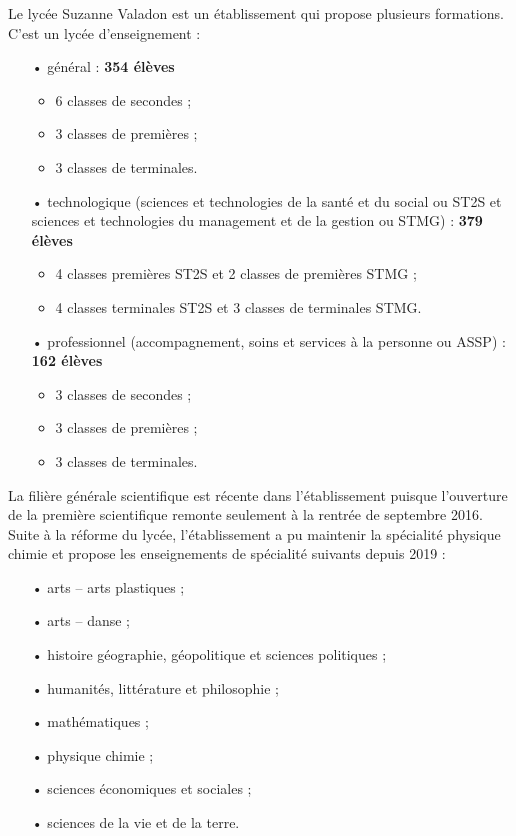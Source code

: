 \documentclass[12pt,a4paper]{article}
\begin{document}
Le lycée Suzanne Valadon est un établissement qui propose plusieurs formations.
C'est un lycée d'enseignement :
\begin{itemize}
\item[•] général : \hfill \textbf{354 élèves}
\begin{itemize}
\item 6 classes de secondes ;
\item 3 classes de premières ;
\item 3 classes de terminales.
\end{itemize}
\item[•] technologique (sciences et technologies de la santé et du social ou ST2S et sciences et technologies du management et de la gestion ou STMG) : \hfill \textbf{379 élèves}
\begin{itemize}
\item 4 classes premières ST2S et 2 classes de premières STMG ;
\item 4 classes terminales ST2S et 3 classes de terminales STMG.
\end{itemize}
\item[•] professionnel (accompagnement, soins et services à la personne ou ASSP) : \hfill \textbf{162 élèves}
\begin{itemize}
\item 3 classes de secondes ;
\item 3 classes de premières ;
\item 3 classes de terminales.
\end{itemize}
\end{itemize}

La filière générale scientifique est récente dans l'établissement puisque l'ouverture de la première scientifique remonte seulement à la rentrée de septembre 2016.
Suite à la réforme du lycée, l'établissement a pu maintenir la spécialité physique chimie et propose les enseignements de spécialité suivants depuis 2019 : 
\begin{itemize}
\item[•] arts -- arts plastiques ;
\item[•] arts -- danse ;
\item[•] histoire géographie, géopolitique et sciences politiques ;
\item[•] humanités, littérature et philosophie ;
\item[•] mathématiques ;
\item[•] physique chimie ;
\item[•] sciences économiques et sociales ;
\item[•] sciences de la vie et de la terre.
\end{itemize}
\end{document}
